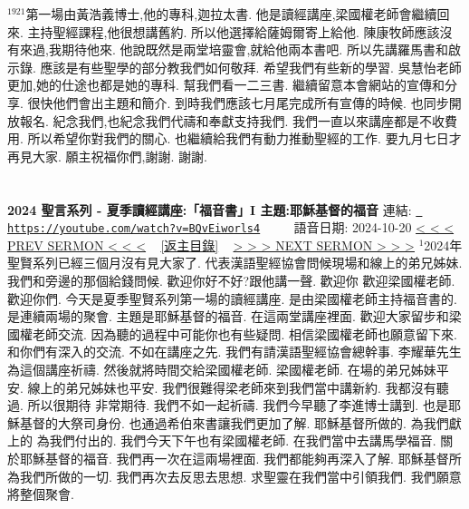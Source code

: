 \documentclass{book}
\begin{document}
$^{1921}$第一場由黃浩義博士,他的專科,迦拉太書.
他是讀經講座,梁國權老師會繼續回來.
主持聖經課程,他很想講舊約.
所以他選擇給薩姆爾寄上給他.
陳康牧師應該沒有來過,我期待他來.
他說既然是兩堂培靈會,就給他兩本書吧.
所以先講羅馬書和啟示錄.
應該是有些聖學的部分教我們如何敬拜.
希望我們有些新的學習.
吳慧怡老師更加,她的仕途也都是她的專科.
幫我們看一二三書.
繼續留意本會網站的宣傳和分享.
很快他們會出主題和簡介.
到時我們應該七月尾完成所有宣傳的時候.
也同步開放報名.
紀念我們,也紀念我們代禱和奉獻支持我們.
我們一直以來講座都是不收費用.
所以希望你對我們的關心.
也繼續給我們有動力推動聖經的工作.
要九月七日才再見大家.
願主祝福你們,謝謝.
謝謝.
\newpage



\section{}
\label{sec:BQvEiworls4}
\textbf{2024 聖言系列 - 夏季讀經講座:「福音書」I 主題:耶穌基督的福音}
\newline
\newline
連結: \href{https://youtube.com/watch?v=BQvEiworls4}{\texttt{ https://youtube.com/watch?v=BQvEiworls4}} ~~~~ 語音日期: 2024-10-20 
\newline
\newline
\hyperref[sec:evqz1q_hC_A]{\small{< < < PREV SERMON < < <}}
~
\hyperref[sec:index]{\small{[返主目錄]}}
~
\hyperref[sec:FsXNMWFwxHg]{\small{> > > NEXT SERMON > > >}}
\newline
\newline
$^{1}$2024年聖賢系列已經三個月沒有見大家了.
代表漢語聖經協會問候現場和線上的弟兄姊妹.
我們和旁邊的那個給錢問候.
歡迎你好不好?跟他講一聲.
歡迎你 歡迎梁國權老師.
歡迎你們.
今天是夏季聖賢系列第一場的讀經講座.
是由梁國權老師主持福音書的.
是連續兩場的聚會.
主題是耶穌基督的福音.
在這兩堂講座裡面.
歡迎大家留步和梁國權老師交流.
因為聽的過程中可能你也有些疑問.
相信梁國權老師也願意留下來.
和你們有深入的交流.
不如在講座之先.
我們有請漢語聖經協會總幹事.
李耀華先生為這個講座祈禱.
然後就將時間交給梁國權老師.
梁國權老師.
在場的弟兄姊妹平安.
線上的弟兄姊妹也平安.
我們很難得梁老師來到我們當中講新約.
我都沒有聽過.
所以很期待 非常期待.
我們不如一起祈禱.
我們今早聽了李進博士講到.
也是耶穌基督的大祭司身份.
也通過希伯來書讓我們更加了解.
耶穌基督所做的.
為我們獻上的 為我們付出的.
我們今天下午也有梁國權老師.
在我們當中去講馬學福音.
關於耶穌基督的福音.
我們再一次在這兩場裡面.
我們都能夠再深入了解.
耶穌基督所為我們所做的一切.
我們再次去反思去思想.
求聖靈在我們當中引領我們.
我們願意將整個聚會.
\end{document}
